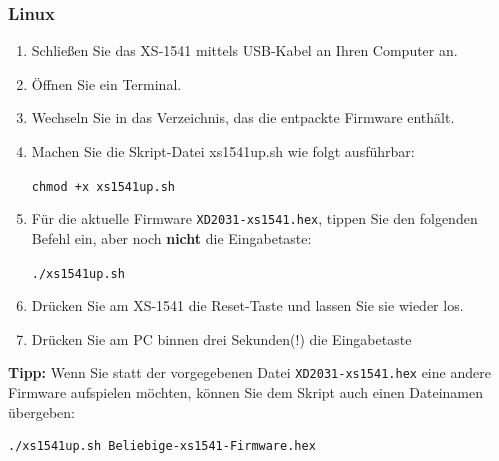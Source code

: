 \documentclass[10pt,a4paper]{scrartcl}		%
\begin{document}
\subsubsection*{Linux}
\begin{enumerate}
\item Schließen Sie das XS-1541 mittels USB-Kabel an Ihren Computer an.
\item Öffnen Sie ein Terminal.
\item Wechseln Sie in das Verzeichnis, das die entpackte Firmware enthält.
\item Machen Sie die Skript-Datei xs1541up.sh wie folgt ausführbar:

\texttt{chmod +x xs1541up.sh}
\item Für die aktuelle Firmware \texttt{XD2031-xs1541.hex}, tippen Sie
	den folgenden Befehl ein, aber noch \textbf{nicht} die
	Eingabetaste:

	\texttt{./xs1541up.sh}

\item Drücken Sie am XS-1541 die Reset-Taste und lassen Sie sie wieder los.
\item Drücken Sie am PC binnen drei Sekunden(!) die Eingabetaste
\end{enumerate}

\textbf{Tipp:} Wenn Sie statt der vorgegebenen Datei 
\texttt{XD2031-xs1541.hex}
eine andere Firmware aufspielen möchten, können Sie
dem Skript auch einen Dateinamen übergeben:

\begin{verbatim}
./xs1541up.sh Beliebige-xs1541-Firmware.hex
\end{verbatim}
\end{document}
